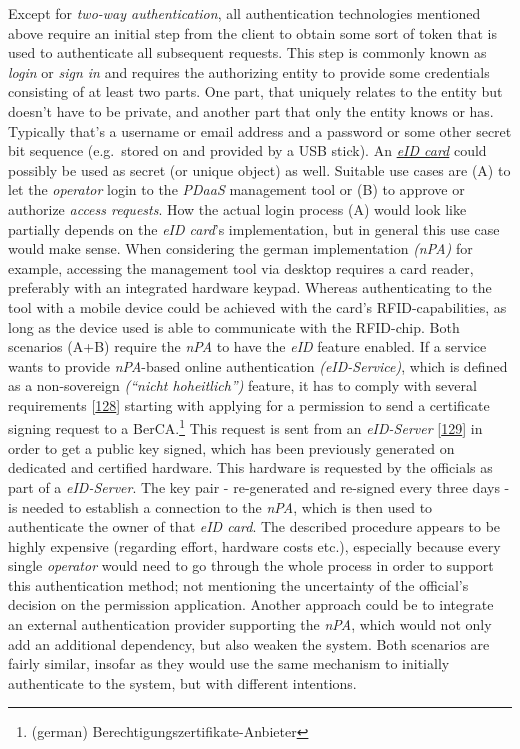 \documentclass[12pt,english,a4paper,titlepage,cleardoublepage=empty,dottedtoc]{report}
\begin{document}
Except for \emph{two-way authentication}, all authentication
technologies mentioned above require an initial step from the client to
obtain some sort of token that is used to authenticate all subsequent
requests. This step is commonly known as \emph{login} or \emph{sign in}
and requires the authorizing entity to provide some credentials
consisting of at least two parts. One part, that uniquely relates to the
entity but doesn't have to be private, and another part that only the
entity knows or has. Typically that's a username or email address and a
password or some other secret bit sequence (e.g.~stored on and provided
by a USB stick). An \emph{\protect\hyperlink{def--eid-card}{eID card}}
could possibly be used as secret (or unique object) as well. Suitable
use cases are (A) to let the \emph{operator} login to the \emph{PDaaS}
management tool or (B) to approve or authorize \emph{access requests}.
How the actual login process (A) would look like partially depends on
the \emph{eID card}'s implementation, but in general this use case would
make sense. When considering the german implementation \emph{(nPA)} for
example, accessing the management tool via desktop requires a card
reader, preferably with an integrated hardware keypad. Whereas
authenticating to the tool with a mobile device could be achieved with
the card's RFID-capabilities, as long as the device used is able to
communicate with the RFID-chip. Both scenarios (A+B) require the
\emph{nPA} to have the \emph{eID} feature enabled. If a service wants to
provide \emph{nPA}-based online authentication \emph{(eID-Service)},
which is defined as a non-sovereign \emph{(``nicht hoheitlich'')}
feature, it has to comply with several requirements
{[}\protect\hyperlink{ref-web_bsi-spec_eid}{128}{]} starting with
applying for a permission to send a certificate signing request to a
BerCA.\footnote{(german) Berechtigungszertifikate-Anbieter} This request
is sent from an \emph{eID-Server}
{[}\protect\hyperlink{ref-web_2017_npa-eid-server}{129}{]} in order to
get a public key signed, which has been previously generated on
dedicated and certified hardware. This hardware is requested by the
officials as part of a \emph{eID-Server}. The key pair - re-generated
and re-signed every three days - is needed to establish a connection to
the \emph{nPA}, which is then used to authenticate the owner of that
\emph{eID card}. The described procedure appears to be highly expensive
(regarding effort, hardware costs etc.), especially because every single
\emph{operator} would need to go through the whole process in order to
support this authentication method; not mentioning the uncertainty of
the official's decision on the permission application. Another approach
could be to integrate an external authentication provider supporting the
\emph{nPA}, which would not only add an additional dependency, but also
weaken the system. Both scenarios are fairly similar, insofar as they
would use the same mechanism to initially authenticate to the system,
but with different intentions.
\end{document}
